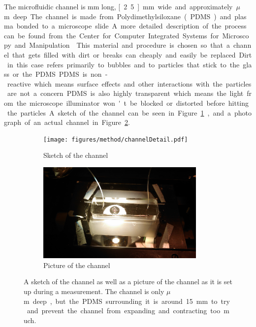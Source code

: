 The microfluidic channel is \unit[40]{mm} long, \unit[2.5]{mm} wide and approximately \unit[150]{$\mu$m} deep. The channel is made from Polydimethylsiloxane (PDMS) and plasma bonded to a microscope slide. A more detailed description of the process can be found from the Center for Computer Integrated Systems for Microscopy and Manipulation~\cite{PDMS}. This material and procedure is chosen so that a channel that gets filled with dirt or breaks can cheaply and easily be replaced. Dirt in this case refers primarily to bubbles and to particles that stick to the glass or the PDMS. PDMS is non-reactive which means surface effects and other interactions with the particles are not a concern. PDMS is also highly transparent which means the light from the microscope illuminator won't be blocked or distorted before hitting the particles. A sketch of the channel can be seen in Figure \ref{fig:channelsketch}, and a photograph of an actual channel in Figure \ref{fig:channelpicture}.

\begin{figure}[H]
\centering
\begin{subfigure}[b]{0.45\textwidth}
\texttt{[image: figures/method/channelDetail.pdf]}
\caption{Sketch of the channel}\label{fig:channelsketch}
\end{subfigure}
\begin{subfigure}[b]{0.45\textwidth}
\includegraphics[width=0.9\textwidth]{figures/method/ChannelZoomed.jpg}
\caption{Picture of the channel}\label{fig:channelpicture}
\end{subfigure}
\caption{A sketch of the channel as well as a picture of the channel as it is set up during a measurement. The channel is only \unit[150]{$\mu$m} deep, but the PDMS surrounding it is around 15 mm to try and prevent the channel from expanding and contracting too much.}
\label{fig:channel}
\end{figure}

